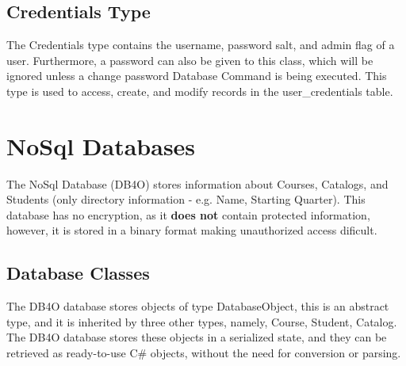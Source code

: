 \documentclass[letterpaper]{report}
\begin{document}
	\subsection{Credentials Type}
	The Credentials type contains the username, password salt, and admin flag of a user. Furthermore, a password can also be given to this class, which will be ignored unless a change password Database Command is being executed. This type is used to access, create, and modify records in the user\_credentials table.
	\section{NoSql Databases}
	The NoSql Database (DB4O) stores information about Courses, Catalogs, and Students (only directory information - e.g. Name, Starting Quarter). This database has no encryption, as it \textbf{does not} contain protected information, however, it is stored in a binary format making unauthorized access dificult.
	\subsection{Database Classes}
	The DB4O database stores objects of type DatabaseObject, this is an abstract type, and it is inherited by three other types, namely, Course, Student, Catalog. The DB4O database stores these objects in a serialized state, and they can be retrieved as ready-to-use C\# objects, without the need for conversion or parsing. 
\end{document}
